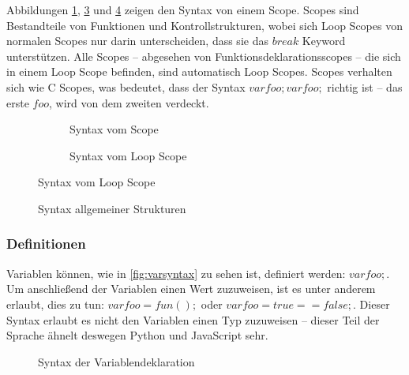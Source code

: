       Abbildungen \ref{fig:scopesyntax}, \ref{fig:loopscopesyntax} und \ref{fig:commonsyntax} zeigen den Syntax von einem Scope. Scopes sind Bestandteile von Funktionen und Kontrollstrukturen, wobei sich Loop Scopes von normalen Scopes nur darin unterscheiden, dass sie das \myMIn$break$ Keyword unterstützen. Alle Scopes -- abgesehen von Funktionsdeklarationsscopes -- die sich in einem Loop Scope befinden, sind automatisch Loop Scopes. Scopes verhalten sich wie C Scopes, was bedeutet, dass der Syntax \myMIn$var foo; {var foo;}$ richtig ist -- das erste \myMIn$foo$, wird von dem zweiten verdeckt.
      \begin{figure}[H]
        \centering
        \begin{minipage}{.45\linewidth}
          \vspace*{2.45em}
          \begin{figure}[H]
            \centering
            \caption{Syntax vom Scope}
            \label{fig:scopesyntax}
          \end{figure}
        \end{minipage}%
        \begin{minipage}{.45\linewidth}
          \begin{figure}[H]
            \centering
            \caption{Syntax vom Loop Scope}
            \label{fig:loopscopesyntax}
          \end{figure}
        \end{minipage}
      \end{figure}

      \begin{figure}[H]
        \centering
        \caption{Syntax allgemeiner Strukturen}
        \label{fig:commonsyntax}
      \end{figure}

    \subsubsection{Definitionen}
    \label{sssec:Definitionen}
      Variablen können, wie in \autoref{fig:varsyntax} zu sehen ist, definiert werden: \myMIn$var foo;$. Um anschließend der Variablen einen Wert zuzuweisen, ist es unter anderem erlaubt, dies zu tun: \myMIn$var foo = fun();$ oder \myMIn$var foo = true == false;$. Dieser Syntax erlaubt es nicht den Variablen einen Typ zuzuweisen -- dieser Teil der Sprache ähnelt deswegen Python und JavaScript sehr.
      \begin{figure}[H]
        \centering
        \caption{Syntax der Variablendeklaration}
        \label{fig:varsyntax}
      \end{figure}

